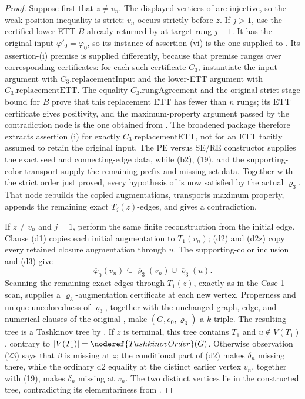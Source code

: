 \begin{proof}
Suppose first that \(z\ne v_n\).  The displayed vertices of
 are injective, so the weak position inequality is
strict: \(v_n\) occurs strictly before \(z\).  If \(j>1\), use the
certified lower ETT \(B\) already returned by
 at target rung \(j-1\).  It has the
original input \(\varphi'_0=\varphi_0\), so its instance of assertion
(vi) is the one supplied to
.  Its assertion-(i) premise is
supplied differently, because that premise ranges over corresponding
certificates: for each such certificate \(C_3\), instantiate the input
argument with \(C_3.\mathrm{replacementInput}\) and the lower-ETT argument
with \(C_3.\mathrm{replacementETT}\).  The equality
\(C_3.\mathrm{rungAgreement}\) and the original strict stage bound for
\(B\) prove that this replacement ETT has fewer than \(n\) rungs; its ETT
certificate gives positivity, and the maximum-property argument passed by
the contradiction node is the one obtained from
.  The broadened package therefore
extracts assertion (i) for exactly \(C_3.\mathrm{replacementETT}\), not for
an ETT tacitly assumed to retain the original input.  The PE versus SE/RE
constructor supplies the exact seed and connecting-edge data, while (b2),
(19), and the supporting-color transport supply the remaining prefix and
missing-set data.  Together with the strict order just proved, every
hypothesis of  is now satisfied
by the actual \(\varrho_3\).  That node rebuilds the copied augmentations,
transports maximum property, appends the remaining exact \(T_j(z)\)-edges,
and gives a contradiction.

If \(z\ne v_n\) and \(j=1\), perform the same finite reconstruction from
the initial edge.  Clause (d1) copies each initial augmentation to
\(T_1(v_n)\); (d2) and (d2z) copy every retained closure augmentation
through \(u\).  The supporting-color inclusion and (d3) give
\[
 \overline\varphi_0(v_n)\subseteq
   \overline\varrho_3(v_n)\cup\overline\varrho_3(u).
\]
Scanning the remaining exact edges through \(T_1(z)\), exactly as in the
Case 1 scan, supplies a \(\varrho_3\)-augmentation certificate at each new
vertex.  Properness and unique uncoloredness of \(\varrho_3\), together
with the unchanged graph, edge, and numerical clauses of the original
, make \((G,e_0,\varrho_3)\) a \(k\)-triple.  The resulting
tree is a Tashkinov tree by
.  If \(z\)
is terminal, this tree contains \(T_1\) and \(u\notin V(T_1)\), contrary
to \(|V(T_1)|=\noderef{TashkinovOrder}(G)\).  Otherwise observation (23)
says that \(\beta\) is missing at \(z\); the conditional part of (d2)
makes \(\delta_n\) missing there, while the ordinary d2 equality at the
distinct earlier vertex \(v_n\), together with (19), makes
\(\delta_n\) missing at \(v_n\).  The two distinct vertices lie in the
constructed tree, contradicting its elementariness from
.


\end{proof}
